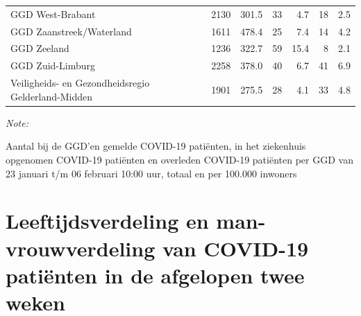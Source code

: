 \documentclass[
  english,
  man,floatsintext]{apa6}
\begin{document}
\begin{table}[H]
\begin{threeparttable}
\begin{tabular}{lrrrrrr}
GGD West-Brabant & 2130 & 301.5 & 33 & 4.7 & 18 & 2.5\\
GGD Zaanstreek/Waterland & 1611 & 478.4 & 25 & 7.4 & 14 & 4.2\\
GGD Zeeland & 1236 & 322.7 & 59 & 15.4 & 8 & 2.1\\
GGD Zuid-Limburg & 2258 & 378.0 & 40 & 6.7 & 41 & 6.9\\
Veiligheids- en Gezondheidsregio Gelderland-Midden & 1901 & 275.5 & 28 & 4.1 & 33 & 4.8\\
\bottomrule
\end{tabular}
\begin{tablenotes}
\item \textit{Note: } 
\item Aantal bij de GGD’en gemelde COVID-19 patiënten, in het ziekenhuis opgenomen COVID-19 patiënten en overleden COVID-19 patiënten per GGD van 23 januari t/m 06 februari 10:00 uur, totaal en per 100.000 inwoners
\end{tablenotes}
\end{threeparttable}
\endgroup{}
\end{table}

\newpage

\hypertarget{leeftijdsverdeling-en-man-vrouwverdeling-van-covid-19-patiuxebnten-in-de-afgelopen-twee-weken}{%
\section{Leeftijdsverdeling en man-vrouwverdeling van COVID-19 patiënten in de afgelopen twee weken}\label{leeftijdsverdeling-en-man-vrouwverdeling-van-covid-19-patiuxebnten-in-de-afgelopen-twee-weken}}
\end{document}
